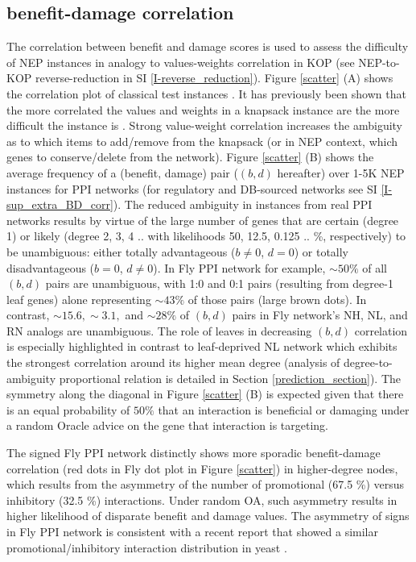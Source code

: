 \documentclass[12pt]{article}
\begin{document}
\subsection{benefit-damage correlation}
The correlation between benefit and damage scores is used to assess the difficulty of NEP instances in analogy to values-weights correlation in KOP (see NEP-to-KOP reverse-reduction in SI \ref{I-reverse_reduction}). Figure \ref{scatter} (A) shows the correlation plot of classical test instances \cite{pisinger_core_1999-1}. It has previously been shown that the more correlated the values and weights in a knapsack instance are the more difficult the instance is \cite{pisinger_where_2005}. Strong value-weight correlation increases the ambiguity as to which items to add/remove from the knapsack (or in NEP context, which genes to conserve/delete from the network). Figure \ref{scatter} (B) shows the average frequency of a (benefit, damage) pair ($(b,d)$ hereafter) over 1-5K NEP instances for PPI networks (for regulatory and DB-sourced networks see SI \ref{I-sup_extra_BD_corr}). The reduced ambiguity in instances from real PPI networks results by virtue of the large number of genes that are certain (degree 1) or likely (degree 2, 3, 4 .. with likelihoods 50, 12.5, 0.125 .. \%, respectively) to be unambiguous: either totally advantageous ($b\neq 0$, $d=0$) or totally disadvantageous ($b=0$, $d\neq 0$). In Fly PPI network for example, ${\sim}50\%$ of all $(b,d)$ pairs are unambiguous,  with 1:0 and 0:1 pairs (resulting from degree-1 leaf genes) alone representing  ${\sim}43\%$  of those pairs (large brown dots). In contrast, ${\sim}15.6, {\sim}3.1,$ and ${\sim}28 \%$ of $(b,d)$ pairs in Fly network's  NH, NL, and RN analogs are unambiguous. The role of leaves in decreasing $(b,d)$ correlation is especially highlighted in contrast to leaf-deprived NL network which exhibits the strongest correlation around its higher mean degree (analysis of degree-to-ambiguity proportional relation is detailed in Section \ref{prediction_section}). The symmetry along the diagonal in Figure \ref{scatter} (B) is expected given that there is an equal probability of $50\%$ that an interaction is beneficial or damaging under a random Oracle advice on the gene that interaction is targeting.

The signed Fly PPI network distinctly shows more sporadic benefit-damage correlation (red dots in Fly dot plot in Figure \ref{scatter}) in higher-degree nodes, which results from the asymmetry of the number of promotional (67.5 \%) versus inhibitory (32.5 \%) interactions. Under random OA, such asymmetry results in higher likelihood of disparate benefit and damage values. The asymmetry of signs in Fly PPI network is consistent with a recent report that showed a similar promotional/inhibitory interaction distribution in yeast \cite{costanzo_global_2016}. 
\end{document}
